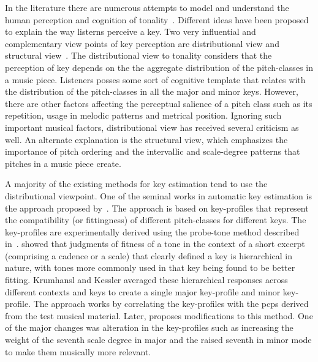 {In the literature there are numerous attempts to model and understand the human perception and cognition of tonality~\cite{longuet1971interpreting,krumhansl1979quantification,chew2000towards,krumhansl2000tonality,cohen1991tonality}. Different ideas have been proposed to explain the way listerns perceive a key. Two very influential and complementary view points of key perception are distributional view and structural view~\cite{Brown1988,temperley2008pitch}.  The distributional view to tonality considers that the perception of key depends on the the aggregate distribution of the pitch-classes in a music piece. Listeners posses some sort of cognitive template that relates with the distribution of the pitch-classes in all the major and minor keys. However, there are other factors affecting the perceptual salience of a pitch class such as its repetition, usage in melodic patterns and metrical position. Ignoring such important musical factors, distributional view has received several criticism as well. An alternate explanation is the structural view, which emphasizes the importance of pitch ordering and the intervallic and scale-degree patterns that pitches in a music piece create.

A majority of the existing methods for key estimation tend to use the distributional viewpoint. One of the seminal works in automatic key estimation is the approach proposed by~\cite{KrumhanslKessler82,krumhansl2001cognitive}. The approach is based on key-profiles that represent the compatibility (or fittingness) of different pitch-classes for different keys. The key-profiles are experimentally derived using the probe-tone method described in~\cite{krumhansl1979quantification}. \cite{krumhansl1979quantification} showed that judgments of fitness of a tone in the context of a short excerpt (comprising a cadence or a scale) that clearly defined a key is hierarchical in nature, with tones more commonly used in that key being found to be better fitting. Krumhansl and Kessler averaged these hierarchical responses across different contexts and keys to create a single
major key-profile and minor key-profile. The approach works by correlating the key-profiles with the \glspl{pcp} derived from the test musical material. Later, \cite{temperley1999s} proposes modifications to this method. One of the major changes was alteration in the key-profiles such as increasing the weight of the seventh scale degree in major and the raised seventh in minor mode to make them musically more relevant. 

}
